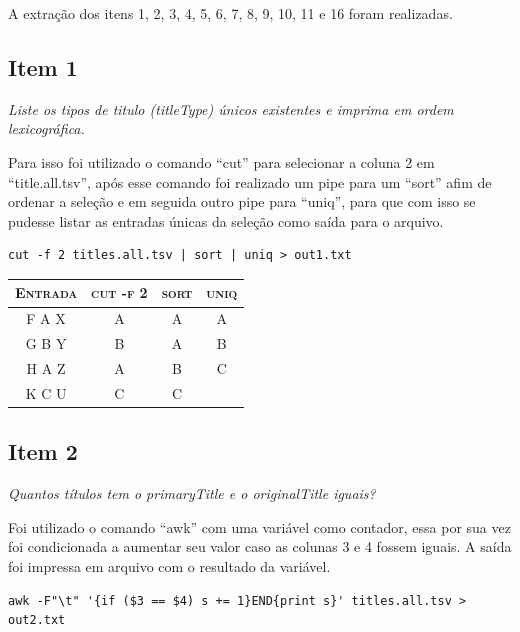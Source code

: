 \documentclass[12pt]{article}
\begin{document}
A extração dos itens 1, 2, 3, 4, 5, 6, 7, 8, 9, 10, 11 e 16 foram realizadas.

\subsection*{Item 1}

\noindent\emph{Liste os tipos de titulo (titleType) únicos existentes e imprima em ordem lexicográfica.}
\vspace{1em}

Para isso foi utilizado o comando ``cut'' para selecionar a coluna 2 em ``title.all.tsv'', após esse comando foi realizado um pipe para um ``sort'' afim de ordenar a seleção e em seguida outro pipe para ``uniq'', para que com isso se pudesse listar as entradas únicas da seleção como saída para o arquivo.

\begin{verbatim}
cut -f 2 titles.all.tsv | sort | uniq > out1.txt
\end{verbatim}

\begin{table}[!h]
    \begin{tabular}{ c c c c }
        \textsc{Entrada} & \textsc{cut -f 2} & \textsc{sort} & \textsc{uniq} \\ 
        \hline
        F A X & A & A & A \\ 
        G B Y & B & A & B \\
        H A Z & A & B & C \\
        K C U & C & C &   \\
    \end{tabular}
\end{table}

\subsection*{Item 2}

\noindent\emph{Quantos títulos tem o primaryTitle e o originalTitle iguais?}
\vspace{1em}

Foi utilizado o comando ``awk'' com uma variável como contador, essa por sua vez foi condicionada a aumentar seu valor caso as colunas 3 e 4 fossem iguais. A saída foi impressa em arquivo com o resultado da variável.

\begin{verbatim}
awk -F"\t" '{if ($3 == $4) s += 1}END{print s}' titles.all.tsv > out2.txt
\end{verbatim}
\end{document}
